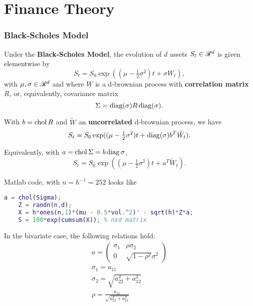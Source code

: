 \part{Finance Theory}

\section{Black-Scholes Model}
\begin{outline}
  \1 Under the \textbf{Black-Scholes Model}, the evolution of $d$ assets $S_t\in\mathscr{R}^d$ is
  given elementwise by
  \begin{equation*}
    S_t = S_0\exp((\mu - \tfrac{1}{2}\sigma^2)t + \sigma W_t),
  \end{equation*}
  with $\mu,\sigma\in\mathscr{R}^d$ and where $W$ is a d-brownian process with \textbf{correlation
  matrix} $R$, or, equivalently, covariance matrix
  \begin{equation*}
    \Sigma=\operatorname{diag}(\sigma)R\operatorname{diag}(\sigma).
  \end{equation*}

  \1 With $b=\operatorname{chol} R$ and $\tilde W$ an \textbf{uncorrelated} d-brownian process, we have
  \begin{equation*}
    S_t = S_0\exp((\mu - \tfrac{1}{2}\sigma^2)t + \operatorname{diag}(\sigma)b^T\tilde W_t).
  \end{equation*}

  \1 Equivalently, with $a=\operatorname{chol}\Sigma = b\operatorname{diag}\sigma$,
  \begin{equation*}
    S_t = S_0\exp((\mu - \tfrac{1}{2}\sigma^2)t + a^T\tilde W_t).
  \end{equation*}

  \1 Matlab code, with $n=h^{-1}=252$ looks like
  \begin{lstlisting}[language=Matlab,basicstyle=\footnotesize,numberstyle=\tiny]
    a = chol(Sigma);
    Z = randn(n,d);
    X = h*ones(n,1)*(mu - 0.5*vol.^2)' - sqrt(h)*Z*a;
    S = 100*exp(cumsum(X)); % nxd matrix
  \end{lstlisting}

  \1 In the bivariate case, the following relations hold:
  \begin{gather*}
    a = \begin{pmatrix}\sigma_1 & \rho\sigma_2\\0&\sqrt{1-\rho^2}\sigma^2\end{pmatrix}\\
    \sigma_1 = a_{11}\\
    \sigma_2 = \sqrt{a_{22}^2 + a_{12}^2}\\
    \rho = \frac{a_{12}}{\sqrt{a_{22}^2 + a_{12}^2}}\\
  \end{gather*}
\end{outline}

